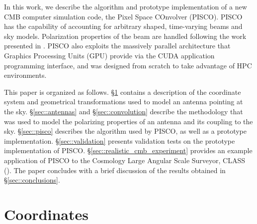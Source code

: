 \documentclass[a4paper,11pt]{article}
\begin{document}

In this work, we describe the algorithm and prototype implementation of a new CMB computer simulation code, the Pixel Space COnvolver (PISCO). PISCO has the capability of accounting for arbitrary shaped, time-varying beams and sky models. Polarization properties of the beam are handled following the work presented in \cite{2007MNRAS.376.1767O}. PISCO also exploits the massively parallel architecture that Graphics Processing Units (GPU) provide via the CUDA application programming interface, and was designed from scratch to take advantage of HPC environments.

This paper is organized as follows. 
\S\ref{sec::coordinate-systems} contains a description of the coordinate system and geometrical transformations used to model an antenna pointing at the sky.
\S\ref{sec::antennas} and \S\ref{sec::convolution} describe the methodology that was used to model the polarizing properties of an antenna and its coupling to the sky.
\S\ref{sec::pisco} describes the algorithm used by PISCO, as well as a prototype implementation. 
\S\ref{sec::validation} presents validation tests on the prototype implementation of PISCO. 
\S\ref{sec::realistic_cmb_experiment} provides an example application of PISCO to the Cosmology Large Angular Scale Surveyor, CLASS (\cite{2016SPIE.9914E..1KH}). 
The paper concludes with a brief discussion of the results obtained in \S\ref{sec::conclusions}.

%
\section{Coordinates}
\label{sec::coordinate-systems}
\end{document}
